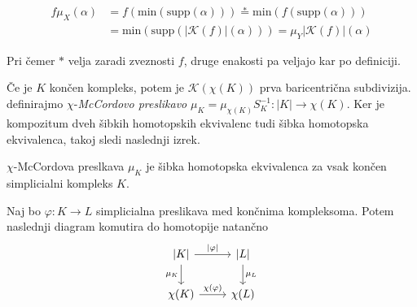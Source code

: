 \documentclass[mat1]{fmfdelo}
\DeclareRobustCommand{\k}{
    \mathcal{K}
}
\begin{document}
\begin{dokaz}
    \begin{align*}
        f\mu_X(\alpha)&=f(\text{min}(\text{supp}(\alpha)))\overset{*}{=}\text{min}(f(\text{supp}(\alpha))) \\
        &=\text{min}(\text{supp}(|\k(f)|(\alpha)))=\mu_Y|\k(f)|(\alpha)
    \end{align*}

    Pri čemer $*$ velja zaradi zveznosti $f$, druge enakosti pa veljajo kar po definiciji.
\end{dokaz}

Če je $K$ končen kompleks, potem je $\k(\chi(K))$ prva baricentrična subdivizija.
definirajmo $\chi$-\textit{McCordovo preslikavo} $\mu_K=\mu_{\chi(K)}S_K^{-1}: |K|\rightarrow \chi(K)$. 
Ker je kompozitum dveh šibkih homotopskih ekvivalenc tudi šibka homotopska ekvivalenca, takoj sledi naslednji izrek.

\begin{izrek}
    \label{iz:xsibka}
    $\chi$-McCordova preslkava $\mu_K$ je šibka homotopska
     ekvivalenca za vsak končen simplicialni kompleks $K$.
\end{izrek}


\begin{trditev}
    Naj bo $\varphi: K\rightarrow L$ simplicialna preslikava med končnima kompleksoma. Potem naslednji diagram komutira do homotopije natančno
    \\
  
\[\begin{tikzcd}
    {|K|} \arrow{r}{|\varphi|} \arrow[swap]{d}{\mu_K} & {|L|} \arrow{d}{\mu_L} \\
    \chi(K) \arrow{r}{\chi(\varphi)} & \chi(L)
    \end{tikzcd}
    \]
\end{trditev}
\end{document}
